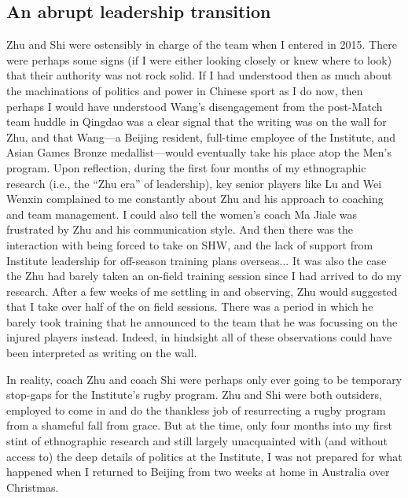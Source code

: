 \begin{CJK}{UTF8}{gbsn}
\subsection{An abrupt leadership transition\label{sect:leadershipTrans}}
Zhu and Shi were ostensibly in charge of the team when I entered in 2015. There were perhaps some signs (if I were either looking closely or knew where to look) that their authority was not rock solid.  If I had understood then as much about the machinations of politics and power in Chinese sport as I do now, then perhaps I would have understood Wang's disengagement from the post-Match team huddle in Qingdao was a clear signal that the writing was on the wall for Zhu, and that Wang---a Beijing resident, full-time employee of the Institute, and Asian Games Bronze medallist---would eventually take his place atop the Men's program. Upon reflection, during the first four months of my ethnographic research (i.e., the ``Zhu era'' of leadership), key senior players like Lu and Wei Wenxin complained to me constantly about Zhu and his approach to coaching and team management.  I could also tell the women's coach Ma Jiale was frustrated by Zhu and his communication style.  And then there was the interaction with being forced to take on SHW, and the lack of support from Institute leadership for off-season training plans overseas... It was also the case the Zhu had barely taken an on-field training session since I had arrived to do my research.  After a few weeks of me settling in and observing, Zhu would suggested that I take over half of the on field sessions.  There was a period in which he barely took training that he announced to the team that he was focussing on the injured players instead. Indeed, in hindsight all of these observations could have been interpreted as writing on the wall.

In reality, coach Zhu and coach Shi were perhaps only ever going to be temporary stop-gaps for the Institute's rugby program.  Zhu and Shi were both outsiders, employed to come in and do the thankless job of resurrecting a rugby program from a shameful fall from grace.  But at the time, only four months into my first stint of ethnographic research and still largely unacquainted with (and without access to) the deep details of politics at the Institute, I was not prepared for what happened when I returned to Beijing from two weeks at home in Australia over Christmas.


\end{CJK}
